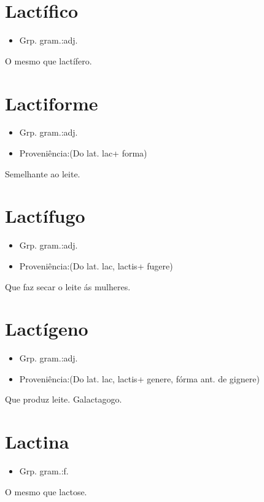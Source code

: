 \section{Lactífico}
\begin{itemize}
\item {Grp. gram.:adj.}
\end{itemize}
O mesmo que \textunderscore lactífero\textunderscore .
\section{Lactiforme}
\begin{itemize}
\item {Grp. gram.:adj.}
\end{itemize}
\begin{itemize}
\item {Proveniência:(Do lat. \textunderscore lac\textunderscore  + \textunderscore forma\textunderscore )}
\end{itemize}
Semelhante ao leite.
\section{Lactífugo}
\begin{itemize}
\item {Grp. gram.:adj.}
\end{itemize}
\begin{itemize}
\item {Proveniência:(Do lat. \textunderscore lac\textunderscore , \textunderscore lactis\textunderscore  + \textunderscore fugere\textunderscore )}
\end{itemize}
Que faz secar o leite ás mulheres.
\section{Lactígeno}
\begin{itemize}
\item {Grp. gram.:adj.}
\end{itemize}
\begin{itemize}
\item {Proveniência:(Do lat. \textunderscore lac\textunderscore , \textunderscore lactis\textunderscore  + \textunderscore genere\textunderscore , fórma ant. de \textunderscore gignere\textunderscore )}
\end{itemize}
Que produz leite.
Galactagogo.
\section{Lactina}
\begin{itemize}
\item {Grp. gram.:f.}
\end{itemize}
O mesmo que \textunderscore lactose\textunderscore .
